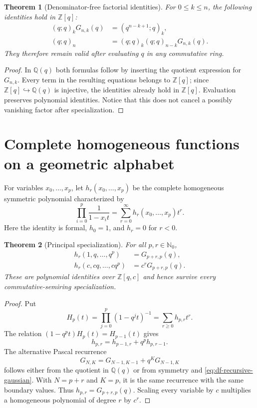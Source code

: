 \documentclass[11pt,oneside,openany]{book}
\newtheorem{theorem}{Theorem}[chapter]
\theoremstyle{definition}
\theoremstyle{remark}
\newcommand{\Q}{\mathbb Q}
\newcommand{\Z}{\mathbb Z}
\newcommand{\N}{\mathbb N}
\begin{document}
\begin{theorem}[Denominator-free factorial identities]
\label{thm:df-factorial-identities}
For $0\le k\le n$, the following identities hold in $\Z[q]$:
\begin{align}
 (q;q)_kG_{n,k}(q)&=(q^{n-k+1};q)_k,
 \label{eq:df-short-factorial}\\
 (q;q)_n&=(q;q)_k(q;q)_{n-k}G_{n,k}(q).
 \label{eq:df-full-factorial}
\end{align}
They therefore remain valid after evaluating $q$ in any commutative ring.
\end{theorem}

\begin{proof}
In $\Q(q)$ both formulas follow by inserting the quotient expression for
$G_{n,k}$.  Every term in the resulting equations belongs to $\Z[q]$; since
$\Z[q]\hookrightarrow\Q(q)$ is injective, the identities already hold in
$\Z[q]$.  Evaluation preserves polynomial identities.  Notice that this does
not cancel a possibly vanishing factor after specialization.
\end{proof}

\section{Complete homogeneous functions on a geometric alphabet}

For variables $x_0,\ldots,x_p$, let $h_r(x_0,\ldots,x_p)$ be the complete
homogeneous symmetric polynomial characterized by
\begin{equation}
 \prod_{i=0}^{p}\frac1{1-x_it}
 =\sum_{r=0}^{\infty}h_r(x_0,\ldots,x_p)t^r.
 \label{eq:df-complete-generating}
\end{equation}
Here the identity is formal, $h_0=1$, and $h_r=0$ for $r<0$.

\begin{theorem}[Principal specialization]
\label{thm:df-principal-specialization}
For all $p,r\in\N_0$,
\begin{align}
 h_r(1,q,\ldots,q^p)&=G_{p+r,p}(q),
 \label{eq:df-principal-specialization}\\
 h_r(c,cq,\ldots,cq^p)&=c^rG_{p+r,p}(q).
 \label{eq:df-scaled-principal-specialization}
\end{align}
These are polynomial identities over $\Z[q,c]$ and hence survive every
commutative-semiring specialization.
\end{theorem}

\begin{proof}
Put
\[
 H_p(t)=\prod_{j=0}^{p}(1-q^jt)^{-1}
       =\sum_{r\ge0}h_{p,r}t^r.
\]
The relation $(1-q^pt)H_p(t)=H_{p-1}(t)$ gives
\[
 h_{p,r}=h_{p-1,r}+q^ph_{p,r-1}.
\]
The alternative Pascal recurrence
\[
 G_{N,K}=G_{N-1,K-1}+q^KG_{N-1,K}
\]
follows either from the quotient in $\Q(q)$ or from symmetry and
\eqref{eq:df-recursive-gaussian}.  With $N=p+r$ and $K=p$, it is the same
recurrence with the same boundary values.  Thus
$h_{p,r}=G_{p+r,p}(q)$.  Scaling every variable by $c$ multiplies a homogeneous
polynomial of degree $r$ by $c^r$.
\end{proof}
\end{document}
